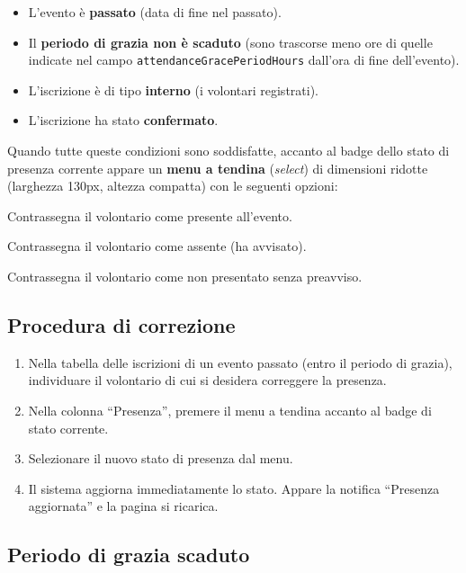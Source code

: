 \documentclass[a4paper,11pt,oneside]{book}
\newcommand{\campo}[1]{\texttt{#1}}
\begin{document}
\begin{itemize}[leftmargin=1.5em]
  \item L'evento \`e \textbf{passato} (data di fine nel passato).
  \item Il \textbf{periodo di grazia non \`e scaduto} (sono trascorse meno ore di quelle indicate nel campo \campo{attendanceGracePeriodHours} dall'ora di fine dell'evento).
  \item L'iscrizione \`e di tipo \textbf{interno} (i volontari registrati).
  \item L'iscrizione ha stato \textbf{confermato}.
\end{itemize}

Quando tutte queste condizioni sono soddisfatte, accanto al badge dello stato di presenza corrente appare un \textbf{menu a tendina} (\textit{select}) di dimensioni ridotte (larghezza 130px, altezza compatta) con le seguenti opzioni:

\begin{description}[leftmargin=1.5em, style=nextline]
  \item[Presente] Contrassegna il volontario come presente all'evento.
  \item[Assente] Contrassegna il volontario come assente (ha avvisato).
  \item[No show] Contrassegna il volontario come non presentato senza preavviso.
\end{description}

\subsection{Procedura di correzione}

\begin{enumerate}[leftmargin=1.5em]
  \item Nella tabella delle iscrizioni di un evento passato (entro il periodo di grazia), individuare il volontario di cui si desidera correggere la presenza.
  \item Nella colonna ``Presenza'', premere il menu a tendina accanto al badge di stato corrente.
  \item Selezionare il nuovo stato di presenza dal menu.
  \item Il sistema aggiorna immediatamente lo stato. Appare la notifica ``Presenza aggiornata'' e la pagina si ricarica.
\end{enumerate}

\subsection{Periodo di grazia scaduto}
\end{document}
